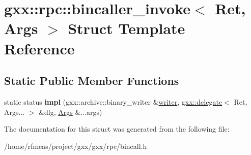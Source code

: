 \hypertarget{structgxx_1_1rpc_1_1bincaller__invoke}{}\section{gxx\+:\+:rpc\+:\+:bincaller\+\_\+invoke$<$ Ret, Args $>$ Struct Template Reference}
\label{structgxx_1_1rpc_1_1bincaller__invoke}
\subsection*{Static Public Member Functions}
\begin{DoxyCompactItemize}
\item 
static status {\bfseries impl} (gxx\+::archive\+::binary\+\_\+writer \&\hyperlink{classgxx_1_1writer}{writer}, \hyperlink{classgxx_1_1delegate}{gxx\+::delegate}$<$ Ret, Args... $>$ \&dlg, \hyperlink{structArgs}{Args} \&...args)\hypertarget{structgxx_1_1rpc_1_1bincaller__invoke_aea5f2de6bf81421cd734665a7d1766fb}{}\label{structgxx_1_1rpc_1_1bincaller__invoke_aea5f2de6bf81421cd734665a7d1766fb}

\end{DoxyCompactItemize}


The documentation for this struct was generated from the following file\+:\begin{DoxyCompactItemize}
\item 
/home/rfmeas/project/gxx/gxx/rpc/bincall.\+h\end{DoxyCompactItemize}
